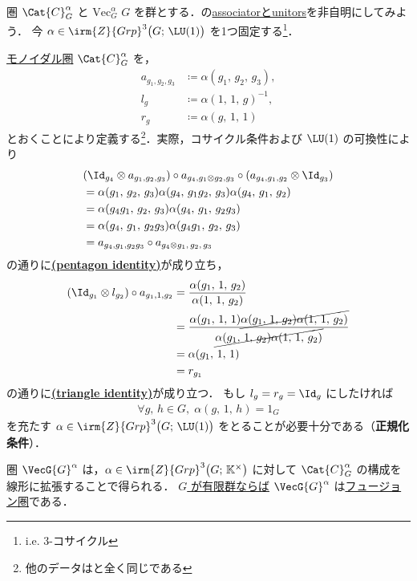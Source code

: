 \documentclass[TQFT_main]{subfiles}
\begin{document}
\begin{myexample}[label=def:CGa]{圏 $\Cat{C}_G^\alpha$ と $\mathrm{Vec}^\alpha_G$}
    $G$ を群とする．の\hyperref[redef:monoidal-category]{associatorとunitors}を非自明にしてみよう．
    今 $\alpha \in \irm{Z}{Grp}^3 \bigl(G;\, \LU(1)\bigr)$ を1つ固定する\footnote{i.e. 3-コサイクル}．
    
    \hyperref[redef:monoidal-category]{モノイダル圏} $\Cat{C}_G^\alpha$ を，
    \begin{align}
        a_{g_1,g_2,g_3} &\coloneqq \alpha(g_1,\, g_2,\, g_3), \\
        l_{g} &\coloneqq \alpha(1,\, 1,\, g)^{-1}, \\
        r_{g} &\coloneqq \alpha(g,\, 1,\, 1)
    \end{align}
    とおくことにより定義する\footnote{他のデータはと全く同じである}．実際，コサイクル条件および $\LU(1)$ の可換性により
    \begin{align}
        &(\Id_{g_4} \otimes a_{g_1,g_2,g_3}) \circ a_{g_4,g_1 \otimes g_2,g_3} \circ (a_{g_4,g_1,g_2} \otimes \Id_{g_3}) \\
        &= \alpha(g_1,\, g_2,\, g_3) \alpha(g_4,\, g_1g_2,\, g_3) \alpha (g_4,\, g_1,\, g_2) \\
        &= \alpha(g_4g_1,\, g_2,\, g_3) \alpha(g_4,\, g_1,\, g_2g_3) \\
        &= \alpha(g_4,\, g_1,\, g_2g_3)\alpha(g_4g_1,\, g_2,\, g_3) \\
        &= a_{g_4,g_1,g_2g_3} \circ a_{g_4 \otimes g_1,\, g_2,\, g_3}
    \end{align}
    の通りに\hyperref[redef:monoidal-category]{\textsf{\textbf{(pentagon identity)}}}が成り立ち，
    \begin{align}
        (\Id_{g_1} \otimes l_{g_2}) \circ a_{g_1,1,g_2} 
        &= \frac{\alpha(g_1,\, 1,\, g_2)}{\alpha(1,\, 1,\, g_2)} \\
        &= \frac{\alpha(g_1,\, 1,\, 1)\cancel{\alpha(g_1,\, 1,\, g_2)\alpha(1,\,1,\, g_2)}}{\cancel{\alpha(g_1,\, 1,\, g_2)\alpha(1,\, 1,\, g_2)}} \\
        &= \alpha (g_1,\, 1,\, 1) \\
        &= r_{g_1}
    \end{align}
    の通りに\hyperref[redef:monoidal-category]{\textsf{\textbf{(triangle identity)}}}が成り立つ．
    もし $l_g = r_g = \Id_g$ にしたければ
    \begin{align}
        \forall g,\, h \in G,\; \alpha (g,\, 1,\, h) = 1_G
    \end{align}
    を充たす $\alpha \in \irm{Z}{Grp}^3\bigl(G;\, \LU(1)\bigr)$ をとることが必要十分である（\textbf{正規化条件}）．

    圏 $\VecG{G}^\alpha$ は，$\alpha \in \irm{Z}{Grp}^3\bigl(G;\, \mathbb{K}^\times\bigr)$ に対して $\Cat{C}_G^\alpha$ の構成を線形に拡張することで得られる．
    \underline{$G$ が有限群ならば} $\VecG{G}^\alpha$ は\hyperref[def:tensorfusion-cat]{フュージョン圏}である．
\end{myexample}
\end{document}

